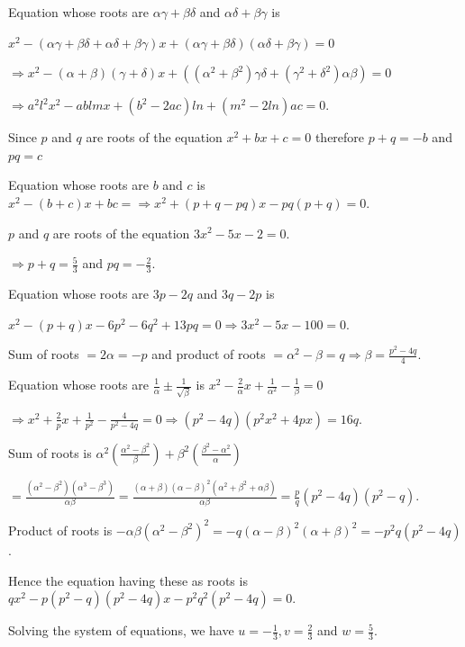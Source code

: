   Equation whose roots are $\alpha\gamma + \beta\delta$ and $\alpha\delta + \beta\gamma$ is

  $x^2 - (\alpha\gamma + \beta\delta + \alpha\delta + \beta\gamma)x + (\alpha\gamma +
  \beta\delta)(\alpha\delta + \beta\gamma) = 0$

  $\Rightarrow x^2 - (\alpha + \beta)(\gamma + \delta)x + ((\alpha^2 + \beta^2)\gamma\delta + (\gamma^2 +
  \delta^2)\alpha\beta) = 0$

  $\Rightarrow a^2l^2x^2 - ablmx + (b^2 - 2ac)ln + (m^2 - 2ln)ac = 0$.
\item Since $p$ and $q$ are roots of the equation $x^2 + bx + c = 0$ therefore $p + q = -b$ and
  $pq = c$

  Equation whose roots are $b$ and $c$ is $x^2 - (b + c)x + bc = \Rightarrow x^2 +(p + q - pq)x - pq(p + q)
  = 0$.
\item $p$ and $q$ are roots of the equation $3x^2 - 5x - 2 = 0$.

  $\Rightarrow p + q = \frac{5}{3}$ and $pq = -\frac{2}{3}$.

  Equation whose roots are $3p - 2q$ and $3q - 2p$ is

  $x^2 - (p + q)x - 6p^2 - 6q^2 + 13pq = 0\Rightarrow 3x^2 - 5x - 100 = 0$.
\item Sum of roots $= 2\alpha = -p$ and product of roots $= \alpha^2 - \beta = q \Rightarrow \beta =
  \frac{p^2 - 4q}{4}$.

  Equation whose roots are $\frac{1}{\alpha}\pm \frac{1}{\sqrt{\beta}}$ is $x^2 - \frac{2}{\alpha}x +
  \frac{1}{\alpha^2} - \frac{1}{\beta} = 0$

  $\Rightarrow x^2 + \frac{2}{p}x + \frac{1}{p^2} - \frac{4}{p^2 - 4q} = 0\Rightarrow (p^2 - 4q)(p^2x^2 +
  4px) = 16q$.
\item Sum of roots is $\alpha^2\left(\frac{\alpha^2 - \beta^2}{\beta}\right) + \beta^2\left(\frac{\beta^2 -
  \alpha^2}{\alpha}\right)$

  $= \frac{(\alpha^2 - \beta^2)(\alpha^3 - \beta^3)}{\alpha\beta} = \frac{(\alpha + \beta)(\alpha -
  \beta)^2(\alpha^2 + \beta^2 + \alpha\beta)}{\alpha\beta}= \frac{p}{q}(p^2 - 4q)(p^2 - q)$.

  Product of roots is $-\alpha\beta(\alpha^2 - \beta^2)^2 = -q(\alpha - \beta)^2(\alpha + \beta)^2 =
  -p^2q(p^2 - 4q)$.

  Hence the equation having these as roots is $qx^2 - p(p^2 - q)(p^2 - 4q)x - p^2q^2(p^2 - 4q) = 0$.
\item Solving the system of equations, we have $u = -\frac{1}{3}, v = \frac{2}{3}$ and $w = \frac{5}{3}$.

